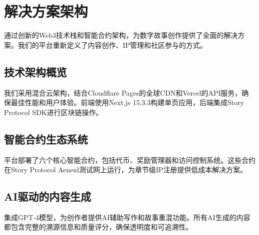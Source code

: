 \section{解决方案架构}\label{sec:solution-architecture-cn}

\storyhouse{}通过创新的Web3技术栈和智能合约架构，为数字故事创作提供了全面的解决方案。我们的平台重新定义了内容创作、IP管理和社区参与的方式。

\subsection{技术架构概览}

我们采用混合云架构，结合Cloudflare Pages的全球CDN和Vercel的API服务，确保最佳性能和用户体验。前端使用Next.js 15.3.3构建单页应用，后端集成Story Protocol SDK进行区块链操作。

\subsection{智能合约生态系统}

平台部署了六个核心智能合约，包括\tip{}代币、奖励管理器和访问控制系统。这些合约在Story Protocol Aeneid测试网上运行，为章节级IP注册提供低成本解决方案。

\subsection{AI驱动的内容生成}

集成GPT-4模型，为创作者提供AI辅助写作和故事重混功能。所有AI生成的内容都包含完整的溯源信息和质量评分，确保透明度和可追溯性。